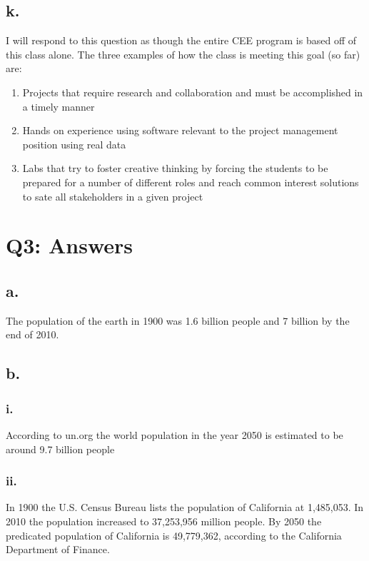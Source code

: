 \documentclass[12pt]{article}
\renewcommand{\=}[1]{\stackrel{#1}{=}} %
\theoremstyle{definition}
\theoremstyle{remark}
\begin{document}
\subsection{k.}
I will respond to this question as though the entire CEE program is based off of this class alone. The three examples of how the class is meeting this goal (so far) are:
\begin{enumerate}
	\item Projects that require research and collaboration and must be accomplished in a timely manner
	\item Hands on experience using software relevant to the project management position using real data
	\item Labs that try to foster creative thinking by forcing the students to be prepared for a number of different roles and reach common interest solutions to sate all stakeholders in a given project
\end{enumerate}


\section{Q3: Answers}

\subsection{a.}
The population of the earth in 1900 was 1.6 billion people and 7 billion by the end of 2010.

\subsection{b.}
\subsubsection{i.}
According to un.org the world population in the year 2050 is estimated to be around 9.7 billion people
\subsubsection{ii.}
In 1900 the U.S. Census Bureau lists the population of California at 1,485,053. In 2010 the population increased to 37,253,956 million people. By 2050 the predicated population of California is 49,779,362, according to the California Department of Finance.
\end{document}

